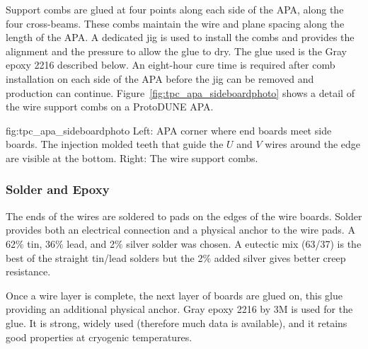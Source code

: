 Support combs are glued at four points along each side of the APA, along the four cross-beams. These combs maintain the wire and plane spacing along the length of the APA. A dedicated jig is used to install the combs and provides the alignment and the pressure to allow the glue to dry. The glue used is the Gray epoxy 2216 described below. An eight-hour cure time is required after comb installation on each side of the APA before the jig can be removed and production can continue.  Figure~\ref{fig:tpc_apa_sideboardphoto} shows a detail of the wire support combs on a ProtoDUNE APA.

\begin{dunefigure}{fig:tpc_apa_sideboardphoto}
{Left: APA corner where end boards meet side boards.  The injection molded teeth that guide the $U$ and $V$ wires around the edge are visible at the bottom. Right: The wire support combs.}
\setlength{\fboxsep}{0pt}
\setlength{\fboxrule}{0.5pt}
\quad
{}
\end{dunefigure}

\subsubsection{Solder and Epoxy}
\label{sec:glue-solder}

The ends of the wires are soldered to pads on the edges of the wire boards.  Solder provides both an electrical connection and a physical anchor to the wire pads. A 62$\%$ tin, 36$\%$ lead, and 2$\%$ silver solder was chosen.  A eutectic mix (63/37) is the best of the straight tin/lead solders but the 2$\%$ added silver gives better creep resistance. 

Once a wire layer is complete, the next layer of boards are glued on, this glue providing an additional physical anchor. Gray epoxy 2216 by 3M is used for the glue.  It is strong, widely used (therefore much data is available), and it retains good properties at cryogenic temperatures.  

